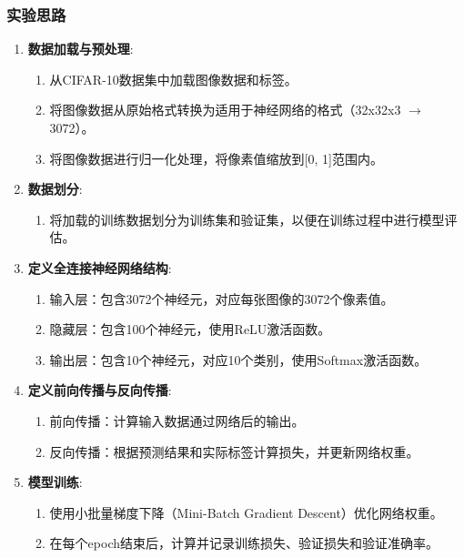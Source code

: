 \documentclass[12pt]{article}
\begin{document}
\subsubsection{实验思路}
\begin{enumerate}
  \item \textbf{数据加载与预处理}:
        \begin{enumerate}
          \item 从CIFAR-10数据集中加载图像数据和标签。
          \item 将图像数据从原始格式转换为适用于神经网络的格式（32x32x3 $\rightarrow$ 3072）。
          \item 将图像数据进行归一化处理，将像素值缩放到[0, 1]范围内。
        \end{enumerate}

  \item \textbf{数据划分}:
        \begin{enumerate}
          \item 将加载的训练数据划分为训练集和验证集，以便在训练过程中进行模型评估。
        \end{enumerate}

  \item \textbf{定义全连接神经网络结构}:
        \begin{enumerate}
          \item 输入层：包含3072个神经元，对应每张图像的3072个像素值。
          \item 隐藏层：包含100个神经元，使用ReLU激活函数。
          \item 输出层：包含10个神经元，对应10个类别，使用Softmax激活函数。
        \end{enumerate}

  \item \textbf{定义前向传播与反向传播}:
        \begin{enumerate}
          \item 前向传播：计算输入数据通过网络后的输出。
          \item 反向传播：根据预测结果和实际标签计算损失，并更新网络权重。
        \end{enumerate}

  \item \textbf{模型训练}:
        \begin{enumerate}
          \item 使用小批量梯度下降（Mini-Batch Gradient Descent）优化网络权重。
          \item 在每个epoch结束后，计算并记录训练损失、验证损失和验证准确率。
        \end{enumerate}


\end{enumerate}
\end{document}
